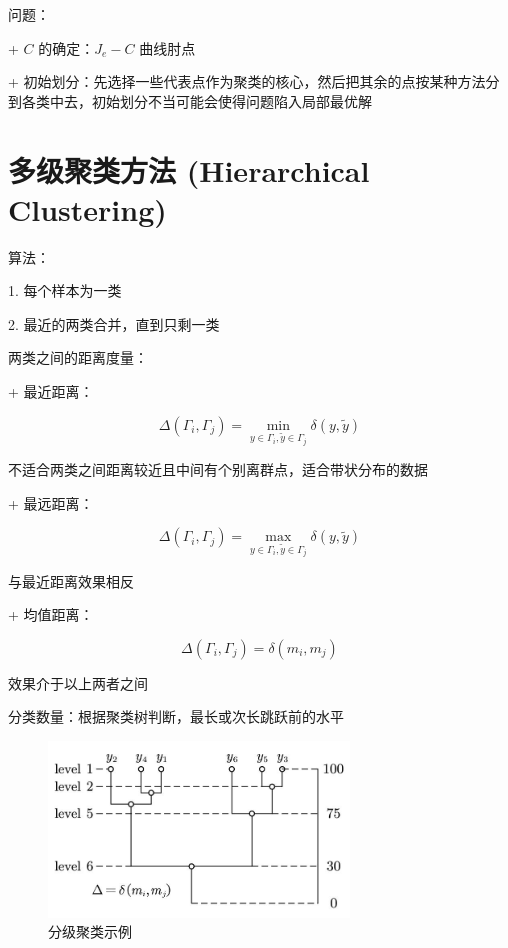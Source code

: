 \documentclass[openany,a4paper,12pt]{ctexbook}
\theoremstyle{kaiti}
\theoremstyle{normal}
\begin{document}
问题：

+ $C$ 的确定：$J_e-C$ 曲线肘点

+ 初始划分：先选择一些代表点作为聚类的核心，然后把其余的点按某种方法分到各类中去，初始划分不当可能会使得问题陷入局部最优解

\section{多级聚类方法 (Hierarchical Clustering) }

算法：

1. 每个样本为一类

2. 最近的两类合并，直到只剩一类

两类之间的距离度量：

+ 最近距离：

  \begin{equation}
  \Delta \left(\Gamma_i,\Gamma_j \right)=\min_{y\in \Gamma_i, \tilde{y}\in \Gamma_j}\delta \left(y,\tilde{y} \right)
  \end{equation}

  不适合两类之间距离较近且中间有个别离群点，适合带状分布的数据

+ 最远距离：

  \begin{equation}
  \Delta \left(\Gamma_i,\Gamma_j \right)=\max_{y\in \Gamma_i, \tilde{y}\in \Gamma_j}\delta \left(y,\tilde{y} \right)
  \end{equation}

  与最近距离效果相反

+ 均值距离：

  \begin{equation}
  \Delta \left(\Gamma_i,\Gamma_j \right)=\delta \left(m_i,m_j \right)
  \end{equation}

  效果介于以上两者之间

分类数量：根据聚类树判断，最长或次长跳跃前的水平

\begin{figure}
  \centering
  \includegraphics[width=8cm]{1627808686180-10.2.jpg}
  \caption{分级聚类示例}
\end{figure}
\end{document}
